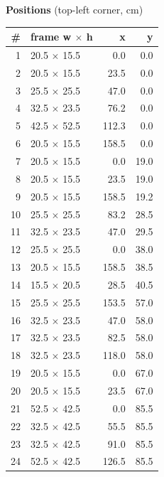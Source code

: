 \documentclass[a4paper,landscape,10pt]{article}
\begin{document}
\begin{minipage}[t]{0.25\textwidth}
\vspace{8pt}
{\bfseries Positions} (top-left corner, cm)\\[2pt]
\tiny
\begin{tabular}{@{}r l r r@{}}
\toprule
\# & frame w $\times$ h & x & y \\
\midrule
1 & 20.5 $\times$ 15.5 & 0.0 & 0.0 \\
2 & 20.5 $\times$ 15.5 & 23.5 & 0.0 \\
3 & 25.5 $\times$ 25.5 & 47.0 & 0.0 \\
4 & 32.5 $\times$ 23.5 & 76.2 & 0.0 \\
5 & 42.5 $\times$ 52.5 & 112.3 & 0.0 \\
6 & 20.5 $\times$ 15.5 & 158.5 & 0.0 \\
7 & 20.5 $\times$ 15.5 & 0.0 & 19.0 \\
8 & 20.5 $\times$ 15.5 & 23.5 & 19.0 \\
9 & 20.5 $\times$ 15.5 & 158.5 & 19.2 \\
10 & 25.5 $\times$ 25.5 & 83.2 & 28.5 \\
11 & 32.5 $\times$ 23.5 & 47.0 & 29.5 \\
12 & 25.5 $\times$ 25.5 & 0.0 & 38.0 \\
13 & 20.5 $\times$ 15.5 & 158.5 & 38.5 \\
14 & 15.5 $\times$ 20.5 & 28.5 & 40.5 \\
15 & 25.5 $\times$ 25.5 & 153.5 & 57.0 \\
16 & 32.5 $\times$ 23.5 & 47.0 & 58.0 \\
17 & 32.5 $\times$ 23.5 & 82.5 & 58.0 \\
18 & 32.5 $\times$ 23.5 & 118.0 & 58.0 \\
19 & 20.5 $\times$ 15.5 & 0.0 & 67.0 \\
20 & 20.5 $\times$ 15.5 & 23.5 & 67.0 \\
21 & 52.5 $\times$ 42.5 & 0.0 & 85.5 \\
22 & 32.5 $\times$ 42.5 & 55.5 & 85.5 \\
23 & 32.5 $\times$ 42.5 & 91.0 & 85.5 \\
24 & 52.5 $\times$ 42.5 & 126.5 & 85.5 \\
\bottomrule
\end{tabular}
\end{minipage}
\clearpage
\end{document}
